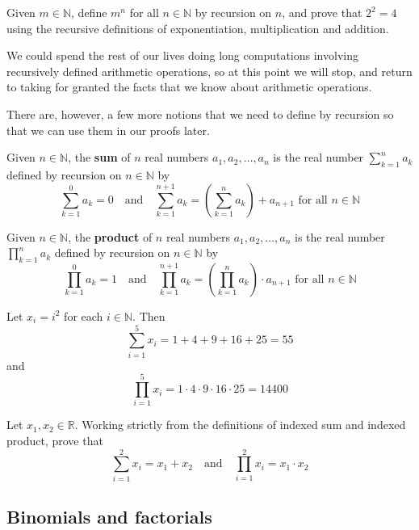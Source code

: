 \begin{exercise}
Given $m \in \mathbb{N}$, define $m^n$ for all $n \in \mathbb{N}$ by recursion on $n$, and prove that $2^2 = 4$ using the recursive definitions of exponentiation, multiplication and addition.
\end{exercise}

We could spend the rest of our lives doing long computations involving recursively defined arithmetic operations, so at this point we will stop, and return to taking for granted the facts that we know about arithmetic operations.

There are, however, a few more notions that we need to define by recursion so that we can use them in our proofs later.

\begin{definition}
\label{defSumOfRealNumbers}
Given $n \in \mathbb{N}$, the \textbf{sum} of $n$ real numbers $a_1, a_2, \dots, a_n$ is the real number $\sum_{k=1}^n a_k$ defined by recursion on $n \in \mathbb{N}$ by
\[ \sum_{k=1}^0 a_k = 0 \quad \text{and} \quad \sum_{k=1}^{n+1} a_k = \left( \sum_{k=1}^n a_k \right) + a_{n+1} \text{ for all } n \in \mathbb{N} \]
\end{definition}

\begin{definition}
\label{defProductOfRealNumbers}
Given $n \in \mathbb{N}$, the \textbf{product} of $n$ real numbers $a_1, a_2, \dots, a_n$ is the real number $\prod_{k=1}^n a_k$ defined by recursion on $n \in \mathbb{N}$ by
\[ \prod_{k=1}^0 a_k = 1 \quad \text{and} \quad \prod_{k=1}^{n+1} a_k = \left( \prod_{k=1}^n a_k \right) \cdot a_{n+1} \text{ for all } n \in \mathbb{N} \]
\end{definition}

\begin{example}
Let $x_i=i^2$ for each $i \in \mathbb{N}$. Then
\[ \sum_{i=1}^5 x_i = 1 + 4 + 9 + 16 + 25 = 55 \]
and
\[ \prod_{i=1}^5 x_i = 1 \cdot 4 \cdot 9 \cdot 16 \cdot 25 = 14400 \]
\end{example}

\begin{exercise}
Let $x_1, x_2 \in \mathbb{R}$. Working strictly from the definitions of indexed sum and indexed product, prove that
\[ \sum_{i=1}^2 x_i = x_1 + x_2 \quad \text{and} \quad \prod_{i=1}^2 x_i = x_1 \cdot x_2 \]
\end{exercise}

\subsection*{Binomials and factorials}


